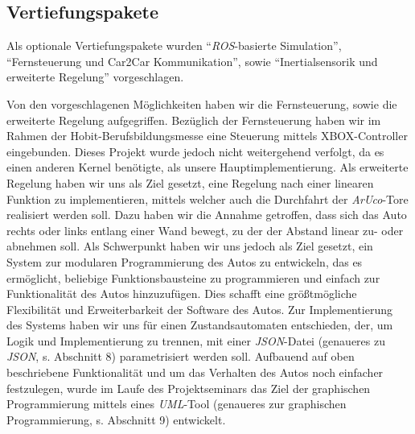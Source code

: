 \subsection{Vertiefungspakete}
Als optionale Vertiefungspakete wurden "`\textit{ROS}-basierte Simulation"', "`Fernsteuerung und Car2Car Kommunikation"', sowie "`Inertialsensorik und erweiterte Regelung"' vorgeschlagen.

Von den vorgeschlagenen Möglichkeiten haben wir die Fernsteuerung, sowie die erweiterte Regelung aufgegriffen. Bezüglich der Fernsteuerung haben wir im Rahmen der Hobit-Berufsbildungsmesse eine Steuerung mittels XBOX-Controller eingebunden. Dieses Projekt wurde jedoch nicht weitergehend verfolgt, da es einen anderen Kernel benötigte, als unsere Hauptimplementierung. 
Als erweiterte Regelung haben wir uns als Ziel gesetzt, eine Regelung nach einer linearen Funktion zu implementieren, mittels welcher auch die Durchfahrt der \textit{ArUco}-Tore realisiert werden soll. Dazu haben wir die Annahme getroffen, dass sich das Auto rechts oder links entlang einer Wand bewegt, zu der der Abstand linear zu- oder abnehmen soll. 
\newline
Als Schwerpunkt haben wir uns jedoch als Ziel gesetzt, ein System zur modularen Programmierung des Autos zu entwickeln, das es ermöglicht, beliebige Funktionsbausteine zu programmieren und einfach zur Funktionalität des Autos hinzuzufügen. Dies schafft eine größtmögliche Flexibilität und Erweiterbarkeit der Software des Autos. 
Zur Implementierung des Systems haben wir uns für einen Zustandsautomaten entschieden, der, um Logik und Implementierung zu trennen, mit einer \textit{JSON}-Datei (genaueres zu \textit{JSON}, s. Abschnitt 8) parametrisiert werden soll. 
Aufbauend auf oben beschriebene Funktionalität und um das Verhalten des Autos noch einfacher festzulegen, wurde im Laufe des Projektseminars das Ziel der graphischen Programmierung mittels eines \textit{UML}-Tool (genaueres zur graphischen Programmierung, s. Abschnitt 9) entwickelt.